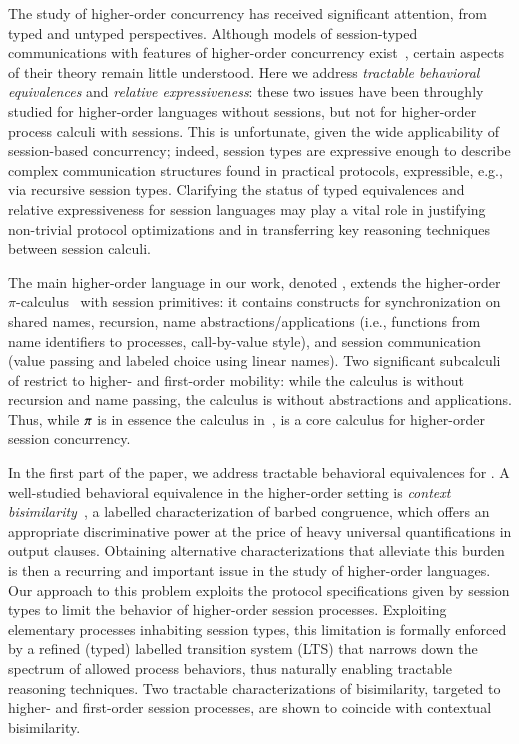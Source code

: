 The study of higher-order concurrency has received significant attention, 
from typed and untyped perspectives.
Although models of session-typed 
communications with features of higher-order concurrency exist~\cite{tlca07,DBLP:journals/jfp/GayV10},
certain aspects of their theory 
remain little understood. Here we address
 \emph{tractable behavioral equivalences} and \emph{relative expressiveness}:
these two issues 
have been throughly studied
for higher-order languages without sessions,
but not for higher-order process calculi with sessions.
This is unfortunate, given the wide applicability of session-based concurrency; indeed,
session types are expressive enough to describe complex 
communication structures found in practical protocols,  expressible, e.g., via recursive session types.
Clarifying the status of typed equivalences and relative expressiveness for session languages
may play a vital role in justifying non-trivial protocol optimizations and in transferring key reasoning techniques between session calculi.

The main higher-order language in our work, denoted \HOp,
extends the higher-order $\pi$-calculus~\cite{SangiorgiD:expmpa} with session primitives:
it contains constructs for 
synchronization on shared names, 
recursion, 
name abstractions/applications (i.e., functions from name identifiers to processes, call-by-value style),
and session communication (value passing and
labeled choice using linear names). 
Two significant subcalculi of \HOp restrict to higher- and first-order mobility:
while the \HO calculus is \HOp without recursion and name passing,
the \sessp calculus is \HOp without abstractions and applications.
Thus, 
while $\pi$ is in essence the calculus in~\cite{honda.vasconcelos.kubo:language-primitives}, 
\HO  is  a core calculus for higher-order session concurrency.

In the first part of the paper, we address tractable behavioral equivalences
for \HOp.
A well-studied behavioral equivalence in the higher-order setting 
is \emph{context bisimilarity}~\cite{San96H},
a labelled characterization of barbed congruence, 
which offers an appropriate discriminative power at the price of heavy universal quantifications in output clauses.
Obtaining alternative characterizations that alleviate this burden
is then a recurring and important issue 
in the study of higher-order languages.
Our approach to this problem 
exploits the protocol specifications given by session types to  limit 
the behavior of higher-order session processes. 
Exploiting elementary processes inhabiting session types, 
this limitation is formally enforced by 
a refined (typed) labelled transition system (LTS)
that narrows down the spectrum of allowed process behaviors, 
thus naturally enabling tractable reasoning techniques. 
Two tractable characterizations of bisimilarity, 
targeted to higher- and first-order session processes,
are shown to coincide with contextual bisimilarity.


